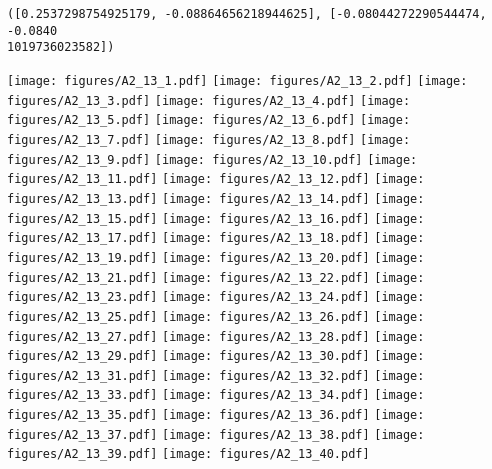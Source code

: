 \documentclass[12pt,a4paper]{article}
\begin{document}
\begin{lstlisting}
([0.2537298754925179, -0.08864656218944625], [-0.08044272290544474, -0.0840
1019736023582])
\end{lstlisting}

\texttt{[image: figures/A2\_13\_1.pdf]}
\texttt{[image: figures/A2\_13\_2.pdf]}
\texttt{[image: figures/A2\_13\_3.pdf]}
\texttt{[image: figures/A2\_13\_4.pdf]}
\texttt{[image: figures/A2\_13\_5.pdf]}
\texttt{[image: figures/A2\_13\_6.pdf]}
\texttt{[image: figures/A2\_13\_7.pdf]}
\texttt{[image: figures/A2\_13\_8.pdf]}
\texttt{[image: figures/A2\_13\_9.pdf]}
\texttt{[image: figures/A2\_13\_10.pdf]}
\texttt{[image: figures/A2\_13\_11.pdf]}
\texttt{[image: figures/A2\_13\_12.pdf]}
\texttt{[image: figures/A2\_13\_13.pdf]}
\texttt{[image: figures/A2\_13\_14.pdf]}
\texttt{[image: figures/A2\_13\_15.pdf]}
\texttt{[image: figures/A2\_13\_16.pdf]}
\texttt{[image: figures/A2\_13\_17.pdf]}
\texttt{[image: figures/A2\_13\_18.pdf]}
\texttt{[image: figures/A2\_13\_19.pdf]}
\texttt{[image: figures/A2\_13\_20.pdf]}
\texttt{[image: figures/A2\_13\_21.pdf]}
\texttt{[image: figures/A2\_13\_22.pdf]}
\texttt{[image: figures/A2\_13\_23.pdf]}
\texttt{[image: figures/A2\_13\_24.pdf]}
\texttt{[image: figures/A2\_13\_25.pdf]}
\texttt{[image: figures/A2\_13\_26.pdf]}
\texttt{[image: figures/A2\_13\_27.pdf]}
\texttt{[image: figures/A2\_13\_28.pdf]}
\texttt{[image: figures/A2\_13\_29.pdf]}
\texttt{[image: figures/A2\_13\_30.pdf]}
\texttt{[image: figures/A2\_13\_31.pdf]}
\texttt{[image: figures/A2\_13\_32.pdf]}
\texttt{[image: figures/A2\_13\_33.pdf]}
\texttt{[image: figures/A2\_13\_34.pdf]}
\texttt{[image: figures/A2\_13\_35.pdf]}
\texttt{[image: figures/A2\_13\_36.pdf]}
\texttt{[image: figures/A2\_13\_37.pdf]}
\texttt{[image: figures/A2\_13\_38.pdf]}
\texttt{[image: figures/A2\_13\_39.pdf]}
\texttt{[image: figures/A2\_13\_40.pdf]}
\end{document}
